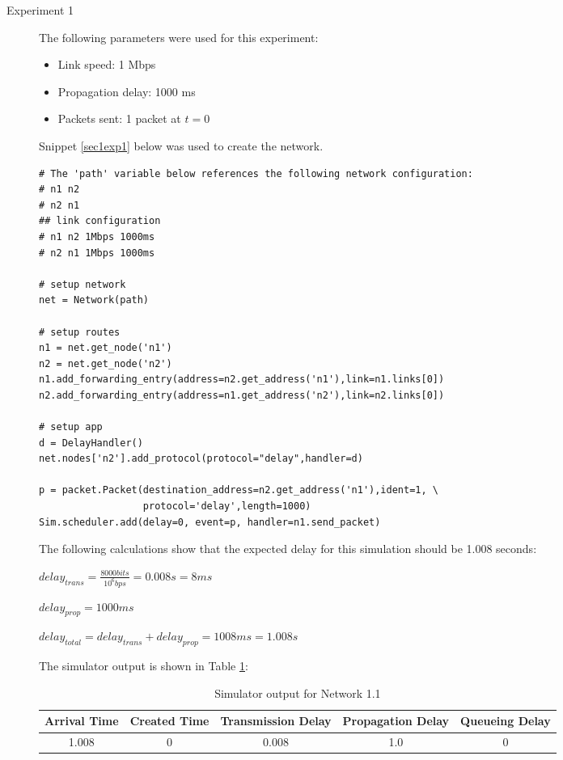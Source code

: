 \documentclass[11pt]{article}
\begin{document}
\begin{description}
\item[Experiment 1] \hfill \break
The following parameters were used for this experiment:

\begin{itemize}
\item Link speed: 1 Mbps
\item Propagation delay: 1000 ms
\item Packets sent: 1 packet at $t = 0$
\end{itemize}

\medskip

Snippet \ref{sec1exp1} below was used to create the network.

\medskip

\begin{lstlisting}[caption={Network 1.1},label=sec1exp1]
# The 'path' variable below references the following network configuration:
# n1 n2
# n2 n1
## link configuration
# n1 n2 1Mbps 1000ms
# n2 n1 1Mbps 1000ms

# setup network
net = Network(path)

# setup routes
n1 = net.get_node('n1')
n2 = net.get_node('n2')
n1.add_forwarding_entry(address=n2.get_address('n1'),link=n1.links[0])
n2.add_forwarding_entry(address=n1.get_address('n2'),link=n2.links[0])

# setup app
d = DelayHandler()
net.nodes['n2'].add_protocol(protocol="delay",handler=d)

p = packet.Packet(destination_address=n2.get_address('n1'),ident=1, \
                  protocol='delay',length=1000)
Sim.scheduler.add(delay=0, event=p, handler=n1.send_packet)
\end{lstlisting}

The following calculations show that the expected delay for this simulation should be 1.008 seconds:
\begin{addmargin}[1em]{0em}
$delay_{trans} = \frac{8000 bits}{10^{6}bps} = 0.008s = 8ms$

$delay_{prop} = 1000ms$

$delay_{total} = delay_{trans} + delay_{prop} = 1008ms = 1.008s$
\end{addmargin}

\bigskip

The simulator output is shown in Table \ref{tbl1.1}:

\smallskip

\begin{table}[H]
\begin{center}
\caption{Simulator output for Network 1.1}
\label{tbl1.1}
\begin{tabular}{ccccc}
  \toprule
  Arrival Time & Created Time & Transmission Delay & Propagation Delay & Queueing Delay\\
  \midrule
  1.008 & 0 & 0.008 & 1.0 & 0\\
  \bottomrule
\end{tabular}
\end{center}
\end{table}


\end{description}
\end{document}
